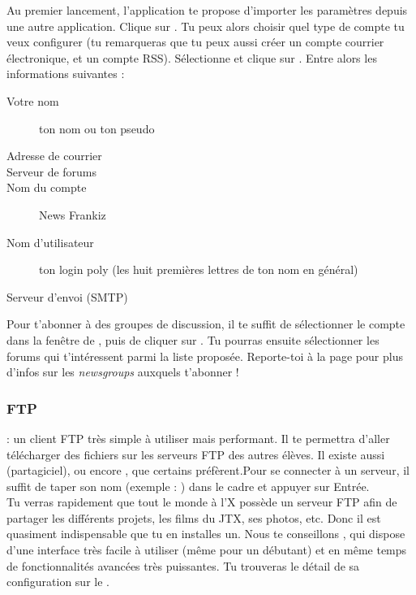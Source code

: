 Au premier lancement, l'application te propose d'importer les paramètres depuis une autre application. Clique sur . Tu peux alors choisir quel type de compte tu veux configurer (tu remarqueras que tu peux aussi créer un compte courrier électronique, et un compte RSS). Sélectionne  et clique sur . Entre alors les informations suivantes :

\begin{description}
  \item[Votre nom] ton nom ou ton pseudo
  \item[Adresse de courrier] 
  \item[Serveur de forums] 
  \item[Nom du compte] News Frankiz
  \item[Nom d'utilisateur] ton login poly (les huit premières lettres de ton nom en général)
  \item[Serveur d'envoi (SMTP)] 
\end{description}

Pour t'abonner à des groupes de discussion, il te suffit de sélectionner le compte  dans la fenêtre  de , puis de cliquer sur . Tu pourras ensuite sélectionner les forums qui t'intéressent parmi la liste proposée. Reporte-toi à la page \pageref{newsgroups} pour plus d'infos sur les \emph{newsgroups} auxquels t'abonner !

\subsubsection{FTP}

  : un client FTP très simple à utiliser mais performant. Il te permettra d'aller télécharger des fichiers sur les serveurs FTP des autres élèves. Il existe aussi  (partagiciel), ou encore , que certains préfèrent.Pour se connecter à un serveur, il suffit de taper son nom (exemple : ) dans le cadre  et appuyer sur Entrée.\\
Tu verras rapidement que tout le monde à l'X possède un serveur FTP afin de partager les différents projets, les films du JTX, ses photos, etc. Donc il est quasiment indispensable que tu en installes un. Nous te conseillons , qui dispose d'une interface très facile à utiliser (même pour un débutant) et en même temps de fonctionnalités avancées très puissantes. Tu trouveras le détail de sa configuration sur le .

